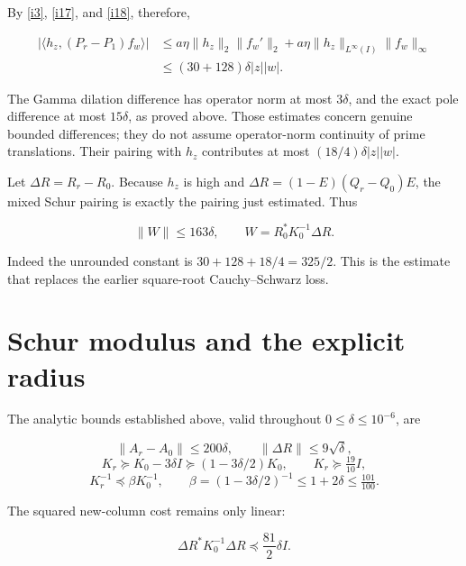 \documentclass[11pt]{article}
\begin{document}
By \eqref{i3}, \eqref{i17}, and \eqref{i18}, therefore,

\begin{equation}\label{i19}
\begin{split}
 |\langle h_z,(P_r-P_1)f_w\rangle|
 &\le a\eta\|h_z\|_2\|f_w'\|_2
       +a\eta\|h_z\|_{L^\infty(I)}\|f_w\|_\infty\\
 &\le(30+128)\delta|z||w|.
 \end{split}
\end{equation}

The Gamma dilation difference has operator norm at most \(3\delta\), and the exact pole difference at most \(15\delta\), as proved above. Those estimates concern genuine bounded differences; they do not assume operator-norm continuity of prime translations. Their pairing with \(h_z\) contributes at most \((18/4)\delta|z||w|\).

Let \(\Delta R=R_r-R_0\). Because \(h_z\) is high and \(\Delta R=(1-E)(Q_r-Q_0)E\), the mixed Schur pairing is exactly the pairing just estimated. Thus

\begin{equation}\label{i20}
\boxed{\|W\|\le163\delta,\qquad
 W=R_0^*K_0^{-1}\Delta R.}
\end{equation}

Indeed the unrounded constant is \(30+128+18/4=325/2\). This is the estimate that replaces the earlier square-root Cauchy--Schwarz loss.

\section{Schur modulus and the explicit radius}

The analytic bounds established above, valid throughout \(0\le\delta\le10^{-6}\), are

\begin{equation}\label{i21}
\|A_r-A_0\|\le200\delta,\qquad
 \|\Delta R\|\le9\sqrt\delta,
\end{equation}
\[
 K_r\succeq K_0-3\delta I\succeq(1-3\delta/2)K_0,
 \qquad K_r\succeq\tfrac{19}{10}I,
\]
\begin{equation}\label{i22}
K_r^{-1}\preceq\beta K_0^{-1},\qquad
 \beta=(1-3\delta/2)^{-1}\le1+2\delta\le\tfrac{101}{100}.
\end{equation}

The squared new-column cost remains only linear:

\[
 \Delta R^*K_0^{-1}\Delta R\preceq\frac{81}2\delta I.
\]
\end{document}

